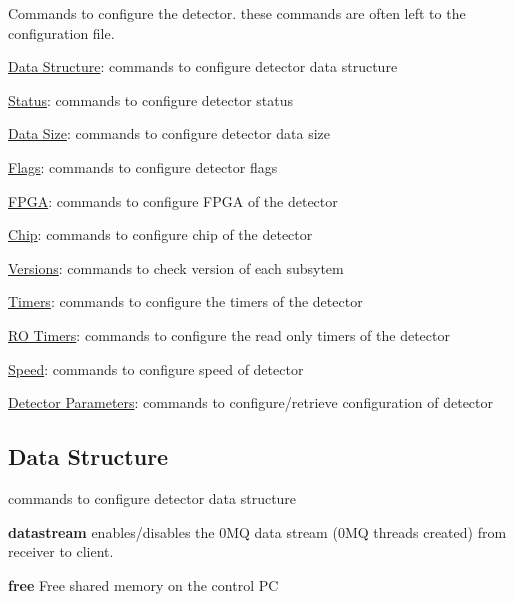 Commands to configure the detector. these commands are often left to the configuration file.
\begin{DoxyItemize}
\item \hyperlink{config_configstructure}{Data Structure}: commands to configure detector data structure
\item \hyperlink{config_configstatus}{Status}: commands to configure detector status
\item \hyperlink{config_configsize}{Data Size}: commands to configure detector data size
\item \hyperlink{config_configflags}{Flags}: commands to configure detector flags
\item \hyperlink{config_configfpga}{FPGA}: commands to configure FPGA of the detector
\item \hyperlink{config_configchip}{Chip}: commands to configure chip of the detector
\item \hyperlink{config_configversions}{Versions}: commands to check version of each subsytem
\item \hyperlink{config_configtimers}{Timers}: commands to configure the timers of the detector
\item \hyperlink{config_configrotimers}{RO Timers}: commands to configure the read only timers of the detector
\item \hyperlink{config_configspeed}{Speed}: commands to configure speed of detector
\item \hyperlink{config_configsettings}{Detector Parameters}: commands to configure/retrieve configuration of detector
\end{DoxyItemize}\hypertarget{config_configstructure}{}\subsection{Data Structure}\label{config_configstructure}
commands to configure detector data structure


\begin{DoxyItemize}
\item {\bfseries datastream} enables/disables the 0MQ data stream (0MQ threads created) from receiver to client.
\end{DoxyItemize}


\begin{DoxyItemize}
\item {\bfseries free} Free shared memory on the control PC
\end{DoxyItemize}


